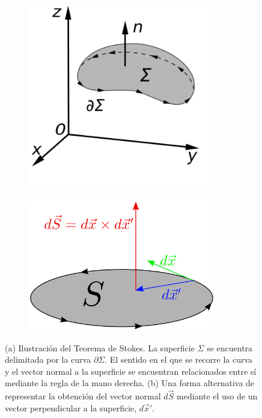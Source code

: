\begin{figure}[htbp]
    \centering
    \begin{subfigure}[b]{0.45\textwidth}
        \includegraphics[width = 0.9\textwidth]{Figuras/Stokes'_Theorem.png}
        \caption{}
        \label{fig:stokes}
    \end{subfigure}
    \hfill
    \begin{subfigure}[b]{0.45\textwidth}
        \includegraphics[width = 0.9\textwidth]{Figuras/Curlorient.png}
        \caption{}
        \label{fig:orientation}
    \end{subfigure}
    \caption{(a) Ilustración del Teorema de Stokes. La superficie $\Sigma$ se encuentra delimitada por la curva $\partial \Sigma$. El sentido en el que se recorre la curva y el vector normal a la superficie se encuentran relacionados entre sí mediante la regla de la mano derecha. (b) Una forma alternativa de representar la obtención del vector normal $d\vec{S}$ mediante el uso de un vector perpendicular a la superficie, $d\vec{x}'$.}
\end{figure}

